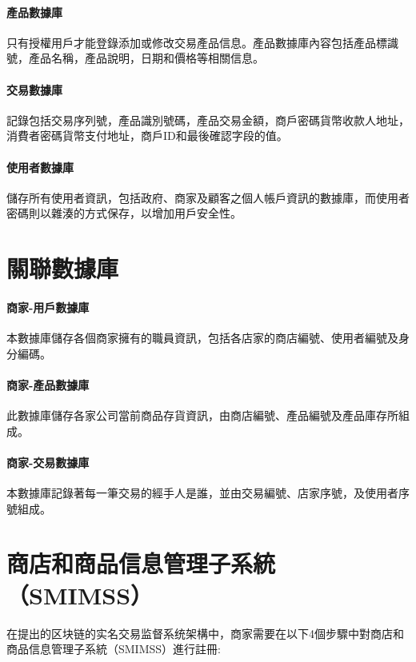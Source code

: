 			\paragraph{產品數據庫}只有授權用戶才能登錄添加或修改交易產品信息。產品數據庫內容包括產品標識號，產品名稱，產品說明，日期和價格等相關信息。
			\paragraph{交易數據庫}記錄包括交易序列號，產品識別號碼，產品交易金額，商戶密碼貨幣收款人地址，消費者密碼貨幣支付地址，商戶ID和最後確認字段的值。
			\paragraph{使用者數據庫}儲存所有使用者資訊，包括政府、商家及顧客之個人帳戶資訊的數據庫，而使用者密碼則以雜湊的方式保存，以增加用戶安全性。

		\section{關聯數據庫}
		\paragraph{商家-用戶數據庫}本數據庫儲存各個商家擁有的職員資訊，包括各店家的商店編號、使用者編號及身分編碼。
		\paragraph{商家-產品數據庫}此數據庫儲存各家公司當前商品存貨資訊，由商店編號、產品編號及產品庫存所組成。
		\paragraph{商家-交易數據庫}本數據庫記錄著每一筆交易的經手人是誰，並由交易編號、店家序號，及使用者序號組成。

	\section{商店和商品信息管理子系統（SMIMSS）}
	在提出的区块链的实名交易监督系统架構中，商家需要在以下4個步驟中對商店和商品信息管理子系統（SMIMSS）進行註冊:

